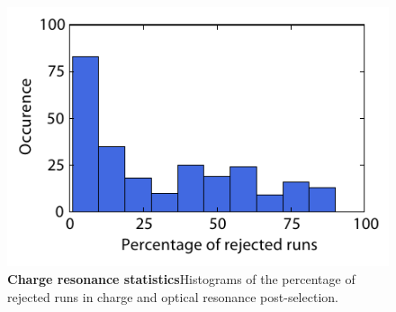 \documentclass{report}
\begin{document}
\begin{figure}[h]
	\centering
	\includegraphics[width=12cm]{figures/Failed_CR_checks}
	\caption{\label{fig:ammS8} \textbf{Charge resonance statistics}Histograms of the percentage of rejected runs in charge and optical resonance post-selection.}
\end{figure}
%
%
\end{document}
